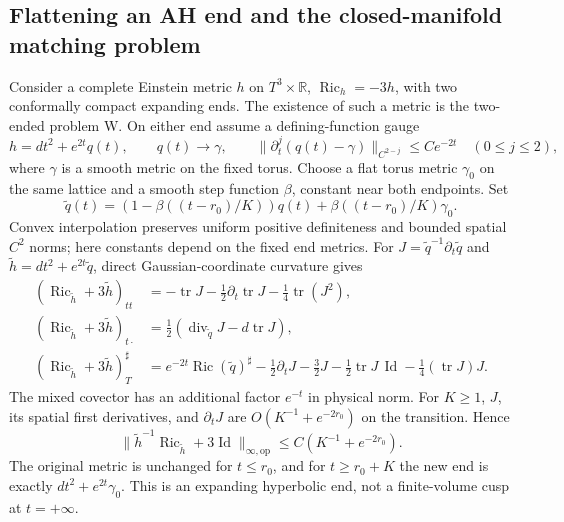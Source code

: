 \documentclass[a4paper,11pt]{article}
\numberwithin{equation}{section}
\theoremstyle{definition}
\newcommand{\Ric}{\operatorname{Ric}}
\newcommand{\tr}{\operatorname{tr}}
\newcommand{\Id}{\operatorname{Id}}
\newcommand{\op}{\mathrm{op}}
\newcommand{\R}{\mathbb R}
\begin{document}
\subsection{Flattening an AH end and the closed-manifold matching problem}\label{sec:AH-matching}
Consider a complete Einstein metric $h$ on $T^3\times\R$, $\Ric_h=-3h$, with two conformally compact expanding ends. The existence of such a metric is the two-ended problem W. On either end assume a defining-function gauge
\[
 h=dt^2+e^{2t}q(t),\qquad q(t)\longrightarrow\gamma,
 \qquad \|\partial_t^j(q(t)-\gamma)\|_{C^{2-j}}\le Ce^{-2t}
 \quad(0\le j\le2),
\]
where $\gamma$ is a smooth metric on the fixed torus. Choose a flat torus metric $\gamma_0$ on the same lattice and a smooth step function $\beta$, constant near both endpoints. Set
\[
 \widetilde q(t)=(1-\beta((t-r_0)/K))q(t)+\beta((t-r_0)/K)\gamma_0.
\]
Convex interpolation preserves uniform positive definiteness and bounded spatial $C^2$ norms; here constants depend on the fixed end metrics. For $J=\widetilde q^{-1}\partial_t\widetilde q$ and $\widetilde h=dt^2+e^{2t}\widetilde q$, direct Gaussian-coordinate curvature gives
\begin{align}
 (\Ric_{\widetilde h}+3\widetilde h)_{tt}
 &=-\tr J-\tfrac12\partial_t\tr J-\tfrac14\tr(J^2),\label{eq:AH-normal}\\
 (\Ric_{\widetilde h}+3\widetilde h)_{t\cdot}
 &=\tfrac12(\operatorname{div}_{\widetilde q}J-d\tr J),\label{eq:AH-mixed}\\
 (\Ric_{\widetilde h}+3\widetilde h)_T^{\sharp}
 &=e^{-2t}\Ric(\widetilde q)^\sharp-\tfrac12\partial_tJ
   -\tfrac32J-\tfrac12\tr J\,\Id-\tfrac14(\tr J)J.\label{eq:AH-tangent}
\end{align}
The mixed covector has an additional factor $e^{-t}$ in physical norm. For $K\ge1$, $J$, its spatial first derivatives, and $\partial_tJ$ are $O(K^{-1}+e^{-2r_0})$ on the transition. Hence
\begin{equation}\label{eq:AH-flatten}
 \|\widetilde h^{-1}\Ric_{\widetilde h}+3\Id\|_{\infty,\op}
   \le C(K^{-1}+e^{-2r_0}).
\end{equation}
The original metric is unchanged for $t\le r_0$, and for $t\ge r_0+K$ the new end is exactly $dt^2+e^{2t}\gamma_0$. This is an expanding hyperbolic end, not a finite-volume cusp at $t=+\infty$.
\end{document}
